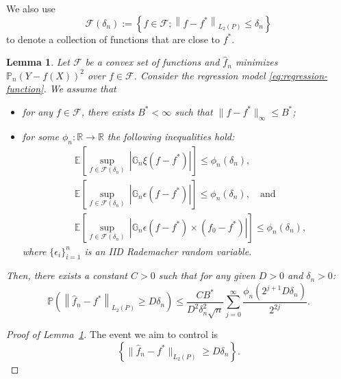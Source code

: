 \documentclass[12pt]{article}
\newtheorem{lemma}[theorem]{Lemma}
\begin{document}
\begin{appendices}
We also use 
\begin{equation*}
\mathcal{F}\left(\delta_n\right):=\left\{f \in \mathcal{F} ;\left\|f-f^*\right\|_{L_2(P)} \leq \delta_n\right\}
\end{equation*}
to denote a collection of functions that are close to $f^*$.

\begin{lemma}
\label{peeling lemma}
Let $\mathcal{F}$ be a convex set of functions and $\widehat f_n$ minimizes $\mathbb{P}_n(Y - f(X))^2$ over $f\in\mathcal{F}$. Consider the regression model \eqref{eq:regression-function}.
We assume that 

\begin{itemize}
    \item for any $f\in\mathcal{F}$, there exists $B^* < \infty$ such that $\|f - f^*\|_\infty \leq B^*$;
    \item for some $\phi_n : \mathbb{R}\rightarrow\mathbb{R}$ the following inequalities hold:
\begin{equation}
\label{three processes equation}
\begin{aligned}
&\mathbb{E} \left[\sup _{f \in \mathcal{F}(\delta_n)}\,\left| \mathbb{G}_n\xi\left(f-f^*\right)\right| \right] \leq \phi_n(\delta_n),\\
&\mathbb{E} \left[ \sup _{f \in \mathcal{F}(\delta_n)}\,\left|\mathbb{G}_n\epsilon\left(f-f^*\right)\right|\right] \leq \phi_n(\delta_n),\quad\textrm{and}\\
&\mathbb{E}  \left[\sup _{f \in\mathcal{F}(\delta_n)}\,\left|\mathbb{G}_n\epsilon\left(f-f^*\right)\times \left(f_0-f^*\right)\right|\right] \leq \phi_n(\delta_n),
\end{aligned}
\end{equation}
where $\{\epsilon_i\}_{i=1}^n$ is an IID Rademacher random variable.
\end{itemize} 

Then, there exists a constant $C>0$ such that for any given $D>0$ and $\delta_n > 0$:
\begin{equation}
\mathbb{P}\left(\left\|\widehat{f}_n-f^*\right\|_{L_2(P)} \geq D \delta_n\right) \leq \frac{C B^*}{D^2 \delta_n^2 \sqrt{n}} \sum_{j=0}^{\infty} \frac{\phi_n\left(2^{j+1} D \delta_n\right)}{2^{2 j}}.
\end{equation}
\end{lemma}
\begin{proof}[Proof of Lemma~\ref{peeling lemma}]
The event we aim to control is
\begin{equation}\nonumber
    \left\{\|\widehat f_n - f^*\|_{L_2(P)} \geq D\delta_n\right\}.
\end{equation}


\end{proof}
\end{appendices}
\end{document}
